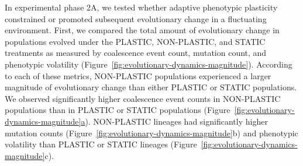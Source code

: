 \begin{raggedbottom}
%
%
%
%

In experimental phase 2A,
we tested whether adaptive phenotypic plasticity constrained or promoted subsequent evolutionary change in a fluctuating environment.
First, we compared the total amount of evolutionary change in populations evolved under the PLASTIC, NON-PLASTIC, and STATIC treatments as measured by coalescence event count, mutation count, and phenotypic volatility (Figure~\ref{fig:evolutionary-dynamics-magnitude}).
According to each of these metrics, NON-PLASTIC populations experienced a larger magnitude of evolutionary change than either PLASTIC or STATIC populations.
We observed significantly higher coalescence event counts in NON-PLASTIC populations than in PLASTIC or STATIC populations (Figure~\ref{fig:evolutionary-dynamics-magnitude}\hyperref[fig:evolutionary-dynamics-magnitude]{a}).
NON-PLASTIC lineages had significantly higher mutation counts (Figure~\ref{fig:evolutionary-dynamics-magnitude}b) and phenotypic volatility than PLASTIC or STATIC lineages (Figure~\ref{fig:evolutionary-dynamics-magnitude}c).


\end{raggedbottom}
